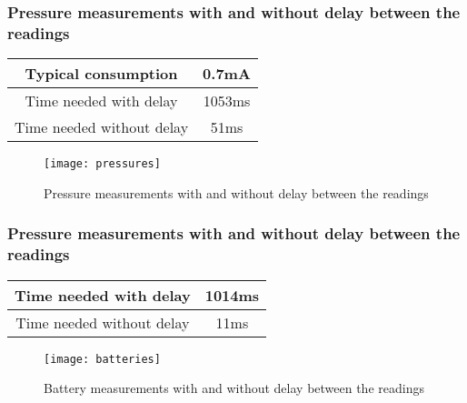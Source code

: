 \subsubsection{Pressure measurements with and without delay between the readings}
\begin{table}[!hb]
\begin{center}
\begin{tabular}[!hb]{|c|c|}
\hline
Typical consumption  & 0.7mA\\
\hline
Time needed with delay & 1053ms\\
\hline
Time needed without delay & 51ms\\
\hline
\end{tabular}
\label{tab:sleep1}
\end{center}
\end{table}
\begin{figure}[htbp]
\centering
\texttt{[image: pressures]}
\caption{Pressure measurements with and without delay between the readings}
\label{fig:pressures}
\end{figure} 
\vfill
\pagebreak
\subsubsection{Pressure measurements with and without delay between the readings}
\begin{table}[!hb]
\begin{center}
\begin{tabular}[!hb]{|c|c|}
\hline
Time needed with delay & 1014ms\\
\hline
Time needed without delay & 11ms\\
\hline
\end{tabular}
\label{tab:sleep1}
\end{center}
\end{table}
\begin{figure}[htbp]
\centering
\texttt{[image: batteries]}
\caption{Battery measurements with and without delay between the readings}
\label{fig:batteries}
\end{figure} 